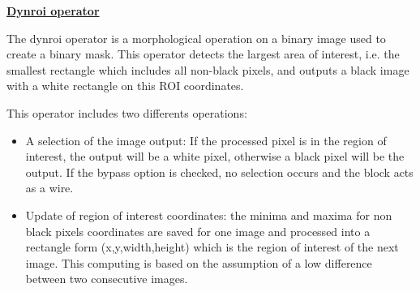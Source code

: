 \documentclass[12pt,a4paper]{article}
\begin{document}
\begin{center}
\textbf{\huge  \underline{Dynroi operator}}
\end{center}
\vspace{0.5cm}

The dynroi operator is a morphological operation on a binary image used to create a binary mask. This operator detects the largest area of interest, i.e. the smallest rectangle which includes all non-black pixels, and outputs a black image with a white rectangle on this ROI coordinates. \\

\begin{figure}[h!]
\centering
{}
\end{figure}

This operator includes two differents operations:
\begin{itemize}
\item A selection of the image output: If the processed pixel is in the region of interest, the output will be a white pixel, otherwise a black pixel will be the output. If the bypass option is checked, no selection occurs and the block acts as a wire.
\item Update of region of interest coordinates: the minima and maxima for non black pixels coordinates are saved for one image and processed into a rectangle form (x,y,width,height) which is the region of interest of the next image. This computing is based on the assumption of a low difference between two consecutive images.
\end{itemize}


\vspace{0.5cm}
\end{document}
